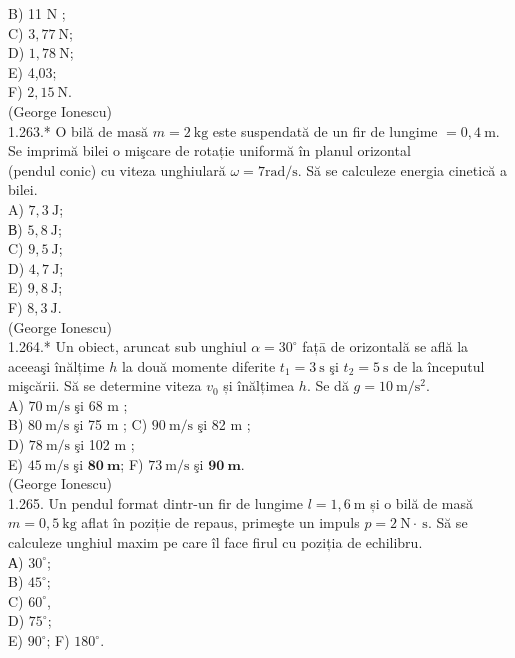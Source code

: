 {B) 11 N ;\\
C) $3,77 \mathrm{~N}$;\\
D) $1,78 \mathrm{~N}$;\\
E) 4,03;\\
F) $2,15 \mathrm{~N}$.\\
(George Ionescu)\\
1.263.* O bilă de masă $m=2 \mathrm{~kg}$ este suspendată de un fir de lungime $=0,4 \mathrm{~m}$. Se imprimă bilei o mişcare de rotație uniformă în planul orizontal\\
(pendul conic) cu viteza unghiulară $\omega=7 \mathrm{rad} / \mathrm{s}$. Să se calculeze energia cinetică a bilei.\\
A) $7,3 \mathrm{~J}$;\\
В) $5,8 \mathrm{~J}$;\\
C) $9,5 \mathrm{~J}$;\\
D) $4,7 \mathrm{~J}$;\\
E) $9,8 \mathrm{~J}$;\\
F) $8,3 \mathrm{~J}$.\\
(George Ionescu)\\
1.264.* Un obiect, aruncat sub unghiul $\alpha=30^{\circ}$ fațā de orizontală se află la aceeaşi înălțime $h$ la două momente diferite $t_{1}=3 \mathrm{~s}$ şi $t_{2}=5 \mathrm{~s}$ de la începutul mişcării. Să se determine viteza $v_{0}$ și înălțimea $h$. Se dă $g=10 \mathrm{~m} / \mathrm{s}^{2}$.\\
A) $70 \mathrm{~m} / \mathrm{s}$ şi 68 m ;\\
B) $80 \mathrm{~m} / \mathrm{s}$ şi 75 m ; C) $90 \mathrm{~m} / \mathrm{s}$ şi 82 m ;\\
D) $78 \mathrm{~m} / \mathrm{s}$ şi 102 m ;\\
E) $45 \mathrm{~m} / \mathrm{s}$ şi $\mathbf{8 0 ~ m}$; F) $73 \mathrm{~m} / \mathrm{s}$ şi $\mathbf{9 0 ~ m}$.\\
(George Ionescu)\\
1.265. Un pendul format dintr-un fir de lungime $l=1,6 \mathrm{~m}$ și o bilă de masă $m=0,5 \mathrm{~kg}$ aflat în poziție de repaus, primeşte un impuls $p=2 \mathrm{~N} \cdot \mathrm{~s}$. Să se calculeze unghiul maxim pe care îl face firul cu poziția de echilibru.\\
А) $30^{\circ}$;\\
B) $45^{\circ}$;\\
C) $60^{\circ}$,\\
D) $75^{\circ}$;\\
E) $90^{\circ}$; F) $180^{\circ}$.\\
}
